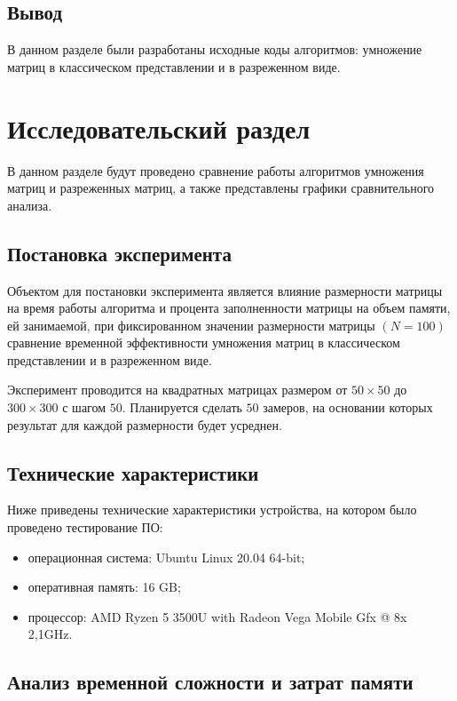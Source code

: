 \section{Вывод}

В данном разделе были разработаны исходные коды алгоритмов: умножение матриц в классическом представлении и в разреженном виде.


\chapter{Исследовательский раздел}

В данном разделе будут проведено сравнение работы алгоритмов умножения матриц и разреженных матриц, а также представлены графики сравнительного анализа.

\section{Постановка эксперимента}

Объектом для постановки эксперимента является влияние размерности матрицы на время работы алгоритма и процента заполненности матрицы на объем памяти, ей занимаемой, при фиксированном значении размерности матрицы $(N = 100)$ сравнение временной эффективности умножения матриц в классическом представлении и в разреженном виде.

Эксперимент проводится на квадратных матрицах размером от $50\times50$ до $300\times300$ с шагом $50$. Планируется сделать $50$ замеров, на основании которых результат для каждой размерности будет усреднен.

\section{Технические характеристики}

Ниже приведены технические характеристики устройства, на котором было проведено тестирование ПО:

\begin{itemize}[$\bullet$]
	\item операционная система: Ubuntu Linux 20.04 64-bit;
	\item оперативная память: 16 GB;
	\item процессор: AMD Ryzen 5 3500U with Radeon Vega Mobile Gfx @ 8x 2,1GHz.
\end{itemize}

\section{Анализ временной сложности и затрат памяти}

